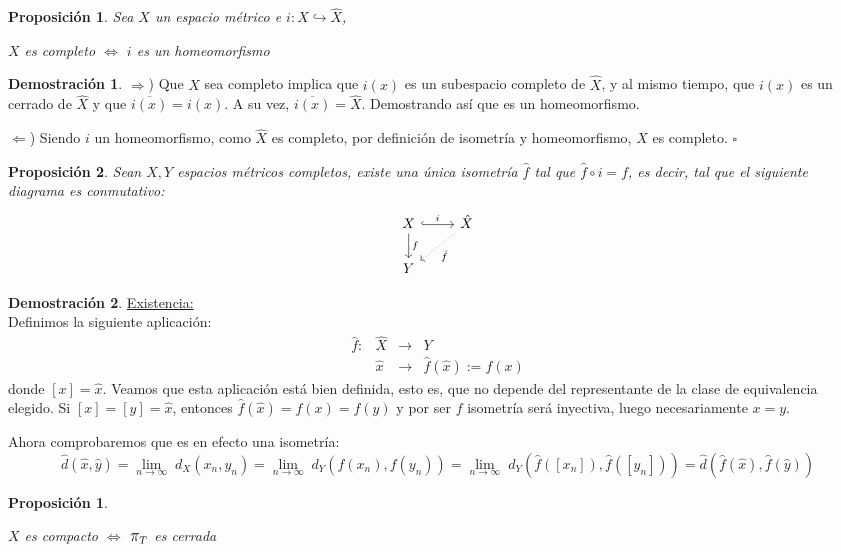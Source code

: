 \documentclass[12pt,twoside]{report}
\theoremstyle{azul}
\newtheorem*{propx}{Proposición}
\theoremstyle{azul2}
\theoremstyle{plain}
\newtheorem*{prop}{Proposición}
\theoremstyle{definition}
\newtheorem*{dem}{Demostración}
\theoremstyle{remark}
\providecommand{\Lim}[3]{\underset{#1\to#2}{\lim}\; #3}
\begin{document}
\begin{prop} Sea $X$ un espacio m{\'e}trico e $i: X \hookrightarrow \hat{X}$,
\vspace{-4mm}\begin{center}
    $X$ es completo $\Leftrightarrow$ $i$ es un homeomorfismo
\end{center}
\end{prop}
\begin{dem} \:
\justifying

$\Rightarrow$) Que $X$ sea completo implica que $i(x)$ es un subespacio completo de $\hat{X}$, y al mismo tiempo, que $i(x)$ es un cerrado de $\hat{X}$ y que $\overline{i(x)}=i(x)$. A su vez, $\overline{i(x)}=\hat{X}$. Demostrando así que es un homeomorfismo.

$\Leftarrow$) Siendo $i$ un homeomorfismo, como $\hat{X}$ es completo, por definición de isometría y homeomorfismo, $X$ es completo. \hfill $\square$
\end{dem}
\begin{prop}
    Sean $X,Y$ espacios m{\'e}tricos completos, existe una {\'u}nica isometr{\'i}a $\hat{f}$ tal que $\hat{f} \circ i = f$, es decir, tal que el siguiente diagrama es conmutativo:
    $$\begin{tikzcd}
     X \arrow[hook]{r}{i} \arrow{d}{f} & \arrow[dotted]{dl}{\hat{f}} \hat{X} \\
     Y & 
\end{tikzcd}$$
\end{prop}
\begin{dem}
\underline{Existencia:}\\
Definimos la siguiente aplicación:
$$\begin{array}{rccl}
     \hat{f}: & \hat{X} & \longrightarrow & Y  \\
     \; & \hat{x} & \longrightarrow & \hat{f}(\hat{x}):=f(x)
\end{array} $$
donde $[x]=\hat{x}$. Veamos que esta aplicación está bien definida, esto es, que no depende del representante de la clase de equivalencia elegido. Si $[x]=[y]=\hat{x}$, entonces $\hat{f}(\hat{x})=f(x)=f(y)$ y por ser $f$ isometría será inyectiva, luego necesariamente $x=y$.

Ahora comprobaremos que es en efecto una isometría:
$$\hat{d}(\hat{x},\hat{y})=\Lim{n}{\infty}{d_X(x_n,y_n)}=\Lim{n}{\infty}{d_Y(f(x_n),f(y_n))}=\Lim{n}{\infty}{d_Y(\hat{f}([x_n]),\hat{f}([y_n]}))=\hat{d}(\hat{f}(\hat{x}),\hat{f}(\hat{y}))$$
\end{dem}
\begin{propx} \:
\vspace{-7mm}\begin{center}
    $X$ es compacto $\Leftrightarrow$ $\mathlarger{\mathlarger{\pi}}_T$ es cerrada
\end{center}
\end{propx}
\end{document}
